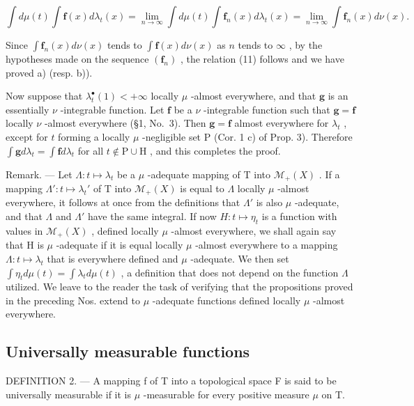 \[
\int d \mu (t) \int \mathbf {f} (x) d \lambda_ {t} (x) = \lim _ {n \rightarrow \infty} \int d \mu (t) \int \mathbf {f} _ {n} (x) d \lambda_ {t} (x) = \lim _ {n \rightarrow \infty} \int \mathbf {f} _ {n} (x) d \nu (x).
\]

Since \(\int \mathbf{f}_n(x) d\nu(x)\) tends to \(\int \mathbf{f}(x) d\nu(x)\) as \(n\) tends to \(\infty\) , by the hypotheses made on the sequence \((\mathbf{f}_n)\) , the relation (11) follows and we have proved a) (resp. b)).

Now suppose that \(\lambda_t^\bullet(1) < +\infty\) locally \(\mu\) -almost everywhere, and that \(\mathbf{g}\) is an essentially \(\nu\) -integrable function. Let \(\mathbf{f}\) be a \(\nu\) -integrable function such that \(\mathbf{g} = \mathbf{f}\) locally \(\nu\) -almost everywhere (§1, No.~3). Then \(\mathbf{g} = \mathbf{f}\) almost everywhere for \(\lambda_t\) , except for \(t\) forming a locally \(\mu\) -negligible set \(\mathrm{P}\) (Cor. 1 c) of Prop. 3). Therefore \(\int \mathbf{g} d\lambda_t = \int \mathbf{f} d\lambda_t\) for all \(t \notin \mathrm{P} \cup \mathrm{H}\) , and this completes the proof.

Remark. --- Let \(\Lambda: t \mapsto \lambda_{t}\) be a \(\mu\) -adequate mapping of T into \(\mathcal{M}_{+}(X)\) . If a mapping \(\Lambda': t \mapsto \lambda_{t}'\) of T into \(\mathcal{M}_{+}(X)\) is equal to \(\Lambda\) locally \(\mu\) -almost everywhere, it follows at once from the definitions that \(\Lambda'\) is also \(\mu\) -adequate, and that \(\Lambda\) and \(\Lambda'\) have the same integral. If now \(H: t \mapsto \eta_{t}\) is a function with values in \(\mathcal{M}_{+}(X)\) , defined locally \(\mu\) -almost everywhere, we shall again say that H is \(\mu\) -adequate if it is equal locally \(\mu\) -almost everywhere to a mapping \(\Lambda: t \mapsto \lambda_{t}\) that is everywhere defined and \(\mu\) -adequate. We then set \(\int \eta_{t} d\mu(t) = \int \lambda_{t} d\mu(t)\) , a definition that does not depend on the function \(\Lambda\) utilized. We leave to the reader the task of verifying that the propositions proved in the preceding Nos. extend to \(\mu\) -adequate functions defined locally \(\mu\) -almost everywhere.

\subsection{Universally measurable functions}

DEFINITION 2. --- A mapping f of T into a topological space F is said to be universally measurable if it is \(\mu\) -measurable for every positive measure \(\mu\) on T.


